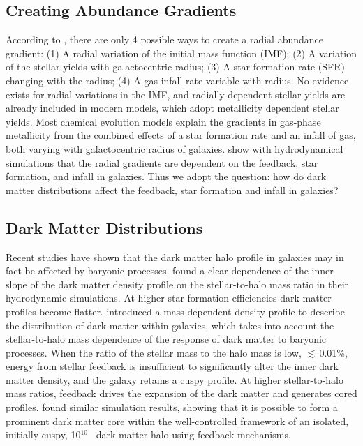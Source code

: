\documentclass[11pt, a4paper, onecolumn]{article}
\begin{document}
\begin{multicols}{2}
\subsection{Creating Abundance Gradients}

    According to \citet{goetz92}, there are only 4 possible ways to create a
    radial abundance gradient: (1) A radial variation of the initial mass
    function (IMF); (2) A variation of the stellar yields with galactocentric
    radius; (3) A star formation rate (SFR) changing with the radius; (4) A gas
    infall rate variable with radius. No evidence exists for radial variations
    in the IMF, and radially-dependent stellar yields are already included in
    modern models, which adopt metallicity dependent stellar yields. Most
    chemical evolution models explain the gradients in gas-phase metallicity
    from the combined effects of a star formation rate and an infall of gas,
    both varying with galactocentric radius of galaxies.  \citet{gibson13} show
    with hydrodynamical simulations that the radial gradients are dependent on
    the feedback, star formation, and infall in galaxies. Thus we adopt the
    question: how do dark matter distributions affect the feedback, star
    formation and infall in galaxies?

\subsection{Dark Matter Distributions}

    Recent studies have shown that the dark matter halo profile in galaxies may
    in fact be affected by baryonic processes. \citet{dicintio14} found a clear
    dependence of the inner slope of the dark matter density profile on the
    stellar-to-halo mass ratio in their hydrodynamic simulations. At higher
    star formation efficiencies dark matter profiles become flatter.
    \citet{dicintio14b} introduced a mass-dependent density profile to describe
    the distribution of dark matter within galaxies, which takes into account
    the stellar-to-halo mass dependence of the response of dark matter to
    baryonic processes. When the ratio of the stellar mass to the halo mass is
    low, $\lesssim$\,0.01\%, energy from stellar feedback is insufficient to
    significantly alter the inner dark matter density, and the galaxy retains a
    cuspy profile. At higher stellar-to-halo mass ratios, feedback drives the
    expansion of the dark matter and generates cored profiles.
    \citet{teyssier13} found similar simulation results, showing that it is
    possible to form a prominent dark matter core within the well-controlled
    framework of an isolated, initially cuspy, 10$^{10}$ \msun\ dark matter
    halo using feedback mechanisms.


\end{multicols}
\end{document}
